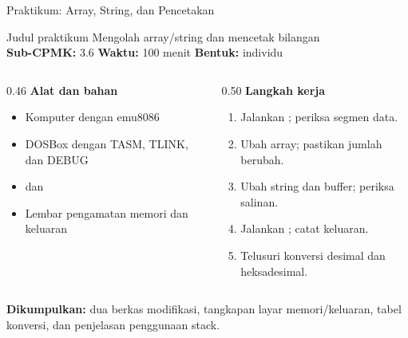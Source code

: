 \documentclass[aspectratio=169,11pt]{beamer}
\begin{document}
\begin{frame}{Praktikum: Array, String, dan Pencetakan}
\begin{block}{Judul praktikum}
\small Mengolah array/string dan mencetak bilangan\\[0.15em]
\textbf{Sub-CPMK:} 3.6 \quad\textbullet\quad
\textbf{Waktu:} 100 menit \quad\textbullet\quad
\textbf{Bentuk:} individu
\end{block}

\vspace{0.2em}
\begin{columns}[t]
\begin{column}{0.46\textwidth}
{\color{obeBlue}\bfseries Alat dan bahan}
\begin{itemize}\footnotesize
    \item Komputer dengan emu8086
    \item DOSBox dengan TASM, TLINK, dan DEBUG
    \item {} dan 
    \item Lembar pengamatan memori dan keluaran
\end{itemize}
\end{column}
\begin{column}{0.50\textwidth}
{\color{obeBlue}\bfseries Langkah kerja}
\begin{enumerate}\footnotesize
    \item Jalankan ; periksa segmen data.
    \item Ubah array; pastikan jumlah berubah.
    \item Ubah string dan buffer; periksa salinan.
    \item Jalankan ; catat keluaran.
    \item Telusuri konversi desimal dan heksadesimal.
\end{enumerate}
\end{column}
\end{columns}

\vspace{0.2em}
{\footnotesize\textbf{Dikumpulkan:} dua berkas 
modifikasi, tangkapan layar memori/keluaran, tabel konversi, dan
penjelasan penggunaan stack.\par}
\end{frame}
\end{document}
